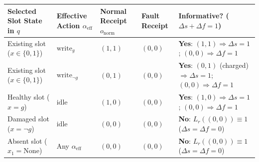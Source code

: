 \documentclass[11pt,a4paper]{article}
\newcounter{none}
\begin{document}

{\def\LTcaptype{none} %
\begin{longtable}[]{@{}
  >{\raggedright\arraybackslash}p{}
  >{\raggedright\arraybackslash}p{}
  >{\centering\arraybackslash}p{}
  >{\centering\arraybackslash}p{}
  >{\raggedright\arraybackslash}p{}@{}}
\toprule\noalign{}
\begin{minipage}[b]{\linewidth}\raggedright
Selected Slot State in \(q\)
\end{minipage} & \begin{minipage}[b]{\linewidth}\raggedright
Effective Action \(\alpha_{\mathrm{eff}}\)
\end{minipage} & \begin{minipage}[b]{\linewidth}\centering
Normal Receipt \(o_{\mathrm{norm}}\)
\end{minipage} & \begin{minipage}[b]{\linewidth}\centering
Fault Receipt
\end{minipage} & \begin{minipage}[b]{\linewidth}\raggedright
Informative? (\(\Delta s + \Delta f = 1\))
\end{minipage} \\
\midrule\noalign{}
\endhead
\bottomrule\noalign{}
\endlastfoot
Existing slot (\(x \in \{0,1\}\)) & \(\mathrm{write}_g\) & \((1, 1)\) &
\((0, 0)\) & \textbf{Yes}: \((1,1) \Rightarrow \Delta s=1\);
\((0,0) \Rightarrow \Delta f=1\) \\
Existing slot (\(x \in \{0,1\}\)) & \(\mathrm{write}_{\neg g}\) &
\((0, 1)\) & \((0, 0)\) & \textbf{Yes}: \((0,1)\) (charged)
\(\Rightarrow \Delta s=1\); \((0,0) \Rightarrow \Delta f=1\) \\
Healthy slot (\(x = g\)) & \(\mathrm{idle}\) & \((1, 0)\) & \((0, 0)\) &
\textbf{Yes}: \((1,0) \Rightarrow \Delta s=1\);
\((0,0) \Rightarrow \Delta f=1\) \\
Damaged slot (\(x = \neg g\)) & \(\mathrm{idle}\) & \((0, 0)\) &
\((0, 0)\) & \textbf{No}: \(L_r((0,0)) \equiv 1\)
(\(\Delta s = \Delta f = 0\)) \\
Absent slot (\(x_1 = \mathrm{None}\)) & Any \(\alpha_{\mathrm{eff}}\) &
\((0, 0)\) & \((0, 0)\) & \textbf{No}: \(L_r((0,0)) \equiv 1\)
(\(\Delta s = \Delta f = 0\)) \\
\end{longtable}
}
\end{document}
